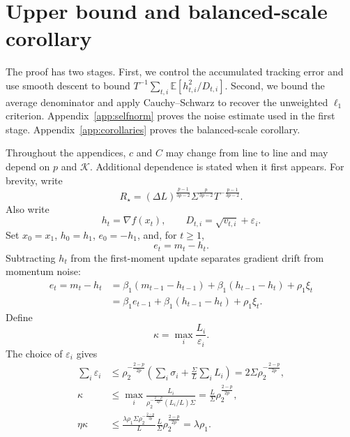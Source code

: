\documentclass[11pt,letterpaper]{article}
\theoremstyle{definition}
\newcommand{\E}{\mathbb E}
\newcommand{\eps}{\varepsilon}
\newcommand{\grad}{\nabla}
\begin{document}



\clearpage
\appendix

\section{Upper bound and balanced-scale corollary}
\label{app:upper}

The proof has two stages. First, we control the accumulated tracking error
and use smooth descent to bound $T^{-1}\sum_{t,i}\E[h_{t,i}^2/D_{t,i}]$.
Second, we bound the average denominator and apply Cauchy--Schwarz to
recover the unweighted $\ell_1$ criterion. Appendix~\ref{app:selfnorm}
proves the noise estimate used in the first stage. Appendix~\ref{app:corollaries} proves the balanced-scale corollary.

Throughout the appendices, $c$ and $C$ may change from line to line and may
depend on $p$ and $\mathcal K$. Additional dependence is stated when it first
appears. For brevity, write
\[
R_\star=(\Delta L)^{\frac{p-1}{3p-2}}
\Sigma^{\frac{p}{3p-2}}T^{-\frac{p-1}{3p-2}}.
\]
Also write
\[
h_t=\grad f(x_t),\qquad
D_{t,i}=\sqrt{v_{t,i}}+\eps_i.
\]
Set $x_0=x_1$, $h_0=h_1$, $e_0=-h_1$, and, for $t\ge1$,
\[
e_t=m_t-h_t.
\]
Subtracting $h_t$ from the first-moment update separates gradient drift
from momentum noise:
\begin{equation}
\begin{aligned}
e_t=m_t-h_t
&=\beta_1(m_{t-1}-h_{t-1})+\beta_1(h_{t-1}-h_t)+\rho_1\xi_t\\
&=\beta_1e_{t-1}+\beta_1(h_{t-1}-h_t)+\rho_1\xi_t.
\end{aligned}
\label{eq:tracking}
\end{equation}
Define
\begin{equation}
\kappa=\max_i\frac{L_i}{\eps_i}.
\label{eq:eps-kappa}
\end{equation}
The choice of $\eps_i$ gives
\begin{equation}
\begin{aligned}
\sum_i\eps_i
&\le\rho_2^{-\frac{2-p}{2p}}\left(\sum_i\sigma_i+
\frac{\Sigma}{L}\sum_iL_i\right)=2\Sigma\rho_2^{-\frac{2-p}{2p}},\\
\kappa
&\le\max_i\frac{L_i}{\rho_2^{-\frac{2-p}{2p}}(L_i/L)\Sigma}
=\frac{L}{\Sigma}\rho_2^{\frac{2-p}{2p}},\\
\eta\kappa
&\le\frac{\lambda\rho_1\Sigma\rho_2^{-\frac{2-p}{2p}}}{L}
\frac{L}{\Sigma}\rho_2^{\frac{2-p}{2p}}=\lambda\rho_1.
\end{aligned}
\label{eq:eps-kappa-bounds}
\end{equation}
\end{document}
